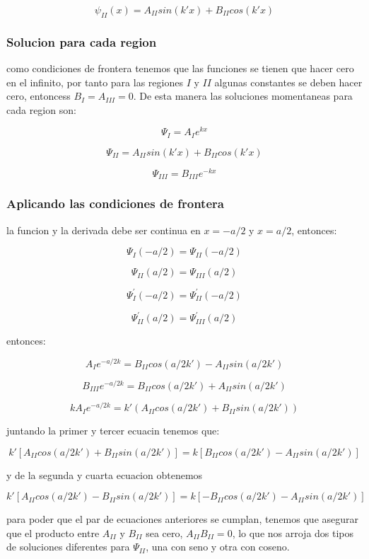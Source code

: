 \documentclass[11pt]{article}
\begin{document}
\[\psi _{II}(x)=A_{II}sin(k'x)+B_{II}cos(k'x)\]

\hypertarget{solucion-para-cada-region}{%
\subsubsection{Solucion para cada
region}\label{solucion-para-cada-region}}

como condiciones de frontera tenemos que las funciones se tienen que
hacer cero en el infinito, por tanto para las regiones \(I\) y \(II\)
algunas constantes se deben hacer cero, entoncess \(B_I=A_{III}=0\). De
esta manera las soluciones momentaneas para cada region son:

\[ \Psi _I=A_Ie^{kx}\]

\[ \Psi _{II}=A_{II}sin(k'x)+B_{II}cos(k'x)\]

\[ \Psi _{III}=B_{III}e^{-kx}\]

\hypertarget{aplicando-las-condiciones-de-frontera}{%
\subsubsection{Aplicando las condiciones de
frontera}\label{aplicando-las-condiciones-de-frontera}}

la funcion y la derivada debe ser continua en \(x=-a/2\) y \(x=a/2\),
entonces:

\[\Psi _I(-a/2)=\Psi _{II}(-a/2)\]

\[\Psi _{II}(a/2)=\Psi _{III}(a/2)\]

\[\Psi _{I}^{'}(-a/2)=\Psi _{II}^{'}(-a/2)\]

\[\Psi _{II}^{'}(a/2)=\Psi _{III}^{'}(a/2)\]

entonces:

\[A_Ie^{-a/2 k}=B_{II}cos(a/2 k')-A_{II}sin(a/2 k')\]

\[B_{III}e^{-a/2 k}=B_{II}cos(a/2 k')+A_{II}sin(a/2 k')\]

\[kA_I e^{-a/2 k}=k'(A_{II}cos(a/2 k')+B_{II}sin(a/2 k'))\]

juntando la primer y tercer ecuacin tenemos que:

\[k'[A_{II}cos(a/2 k')+B_{II}sin(a/2 k')]=k[B_{II}cos(a/2 k')-A_{II}sin(a/2 k')]\]

y de la segunda y cuarta ecuacion obtenemos

\[k'[A_{II}cos(a/2 k')-B_{II}sin(a/2 k')]=k[-B_{II}cos(a/2 k')-A_{II}sin(a/2 k')]\]

para poder que el par de ecuaciones anteriores se cumplan, tenemos que
asegurar que el producto entre \(A_{II}\) y \(B_{II}\) sea cero,
\(A_{II}B_{II}=0\), lo que nos arroja dos tipos de soluciones diferentes
para \(\Psi_{II}\), una con seno y otra con coseno.
\end{document}
